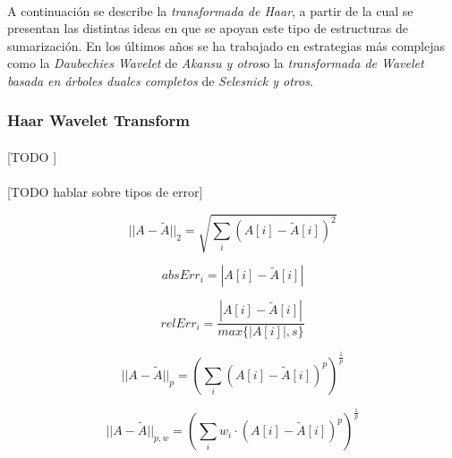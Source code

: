 \documentclass{subfiles}
\begin{document}
        \paragraph{}
        A continuación se describe la \emph{transformada de Haar}, a partir de la cual se presentan las distintas ideas en que se apoyan este tipo de estructuras de sumarización. En los últimos años se ha trabajado en estrategias más complejas como la \emph{Daubechies Wavelet} \cite{akansu2001multiresolution} de \emph{Akansu y otros}o la \emph{transformada de Wavelet basada en árboles duales completos} \cite{selesnick2005dual} de \emph{Selesnick y otros}.

        \subsubsection{Haar Wavelet Transform}

          \paragraph{}
          [TODO ]

        \paragraph{}
        [TODO hablar sobre tipos de error]

        \begin{equation}
        \label{eq:l2_error}
          ||A - \widetilde{A} ||_2  = \sqrt{\sum_{i}(A[i]-\widetilde{A}[i])^2}
        \end{equation}

        \begin{equation}
        \label{eq:abs_error}
          absErr_i = |A[i]-\widetilde{A}[i]|
        \end{equation}

        \begin{equation}
        \label{eq:rel_error}
          relErr_i = \frac{|A[i]-\widetilde{A}[i]|}{max\{|A[i]|,s\}}
        \end{equation}

        \begin{equation}
        \label{eq:lp_error}
        ||A - \widetilde{A} ||_{p}  = (\sum_{i}(A[i]-\widetilde{A}[i])^p)^{\frac{1}{p}}
        \end{equation}

        \begin{equation}
        \label{eq:lp_w_error}
        ||A - \widetilde{A} ||_{p,w}  = (\sum_{i}w_i \cdot(A[i]-\widetilde{A}[i])^p)^{\frac{1}{p}}
        \end{equation}
\end{document}
